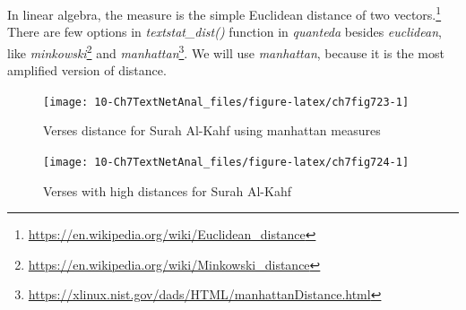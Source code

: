\documentclass[
]{article}
\newenvironment{Shaded}{\begin{snugshade}}{\end{snugshade}}
\newcommand{\AttributeTok}[1]{\textcolor[rgb]{0.13,0.29,0.53}{#1}}
\newcommand{\ConstantTok}[1]{\textcolor[rgb]{0.56,0.35,0.01}{#1}}
\newcommand{\DecValTok}[1]{\textcolor[rgb]{0.00,0.00,0.81}{#1}}
\newcommand{\FunctionTok}[1]{\textcolor[rgb]{0.13,0.29,0.53}{\textbf{#1}}}
\newcommand{\NormalTok}[1]{#1}
\newcommand{\OtherTok}[1]{\textcolor[rgb]{0.56,0.35,0.01}{#1}}
\newcommand{\SpecialCharTok}[1]{\textcolor[rgb]{0.81,0.36,0.00}{\textbf{#1}}}
\newcommand{\StringTok}[1]{\textcolor[rgb]{0.31,0.60,0.02}{#1}}
\begin{document}
In linear algebra, the measure is the simple Euclidean distance of two vectors.\footnote{\url{https://en.wikipedia.org/wiki/Euclidean_distance}} There are few options in \emph{textstat\_dist()} function in \emph{quanteda} besides \emph{euclidean}, like \emph{minkowski}\footnote{\url{https://en.wikipedia.org/wiki/Minkowski_distance}} and \emph{manhattan}\footnote{\url{https://xlinux.nist.gov/dads/HTML/manhattanDistance.html}}. We will use \emph{manhattan}, because it is the most amplified version of distance.

\begin{Shaded}
\end{Shaded}

\begin{figure}

{\centering \texttt{[image: 10-Ch7TextNetAnal\_files/figure-latex/ch7fig723-1]} 

}

\caption{Verses distance for Surah Al-Kahf using manhattan measures}\label{fig:ch7fig723}
\end{figure}

\begin{figure}

{\centering \texttt{[image: 10-Ch7TextNetAnal\_files/figure-latex/ch7fig724-1]} 

}

\caption{Verses with high distances for Surah Al-Kahf}\label{fig:ch7fig724}
\end{figure}
\end{document}
